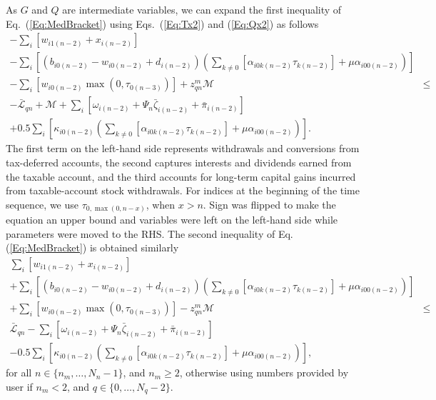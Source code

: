 \documentclass{report}[fleqn,11pt]
\begin{document}
	As $G$ and $Q$ are intermediate variables, we can expand the first inequality of Eq.~(\ref{Eq:MedBracket})
	using Eqs.~(\ref{Eq:Tx2}) and (\ref{Eq:Qx2}) as follows
	\begin{eqnarray}
		\label{Eq:Med1}
		- \sum_i [w_{i1(n-2)} + x_{i(n-2)}] && \nonumber \\
		- \sum_i \left[(b_{i0(n-2)} - w_{i0(n-2)} + d_{i(n-2)})
                \left(\sum_{k\neq 0}[\alpha_{i0k(n-2)}\tau_{k(n-2)}] + \mu\alpha_{i00(n-2)}\right)\right] &&
		\nonumber \\
		- \sum_i [w_{i0(n-2)}\max(0, \tau_{0(n-3)})] + z_{qn}^m \mathcal{M}
		& \leq& \nonumber \\
                - \bar{\mathcal{L}}_{qn} + \mathcal{M}
		+ \sum_i [\omega_{i(n-2)} + \Psi_n\bar\zeta_{i(n-2)} + \bar{\pi}_{i(n-2)}] && \nonumber\\
		+ 0.5\sum_{i} \left[\kappa_{i0(n-2)} \left(\sum_{k\neq 0}[\alpha_{i0k(n-2)}\tau_{k(n-2)}] + \mu\alpha_{i00(n-2)}\right)\right]. && 
	\end{eqnarray}
	The first term on the left-hand side represents withdrawals and conversions from tax-deferred accounts,
        the second captures interests and dividends earned from the taxable account,
        and the third accounts for long-term capital gains incurred from taxable-account stock withdrawals.
	For indices at the beginning of the time sequence, we use $\tau_{0, \max(0, n-x)}$, when $x>n$.
	Sign was flipped to make the equation an upper bound and variables were left on the left-hand side
        while parameters were moved to the RHS. The second inequality of Eq.(\ref{Eq:MedBracket})
        is obtained similarly
	\begin{eqnarray}
		\label{Eq:Med2}
		\sum_i [w_{i1(n-2)} + x_{i(n-2)}] && \nonumber \\
		+ \sum_i \left[(b_{i0(n-2)} - w_{i0(n-2)} + d_{i(n-2)})
                \left(\sum_{k\neq 0}[\alpha_{i0k(n-2)}\tau_{k(n-2)}] + \mu\alpha_{i00(n-2)}\right)\right] &&
		\nonumber \\
		+ \sum_i [w_{i0(n-2)}\max(0, \tau_{0(n-3)})] - z_{qn}^m \mathcal{M}
		& \leq& \nonumber \\
                 \bar{\mathcal{L}}_{qn}
		- \sum_i [\omega_{i(n-2)} + \Psi_n\bar\zeta_{i(n-2)} + \bar{\pi}_{i(n-2)}] && \nonumber\\
		- 0.5\sum_{i} \left[\kappa_{i0(n-2)} \left(\sum_{k\neq 0}[\alpha_{i0k(n-2)}\tau_{k(n-2)}] + \mu\alpha_{i00(n-2)}\right)\right], && 
	\end{eqnarray}
	for all $n \in \{n_m, \ldots, N_n-1\}$, and $n_m \ge 2$,
	otherwise using numbers provided by user if $n_m < 2$, and $q \in \{0,\ldots,N_q - 2\}$.
\end{document}
